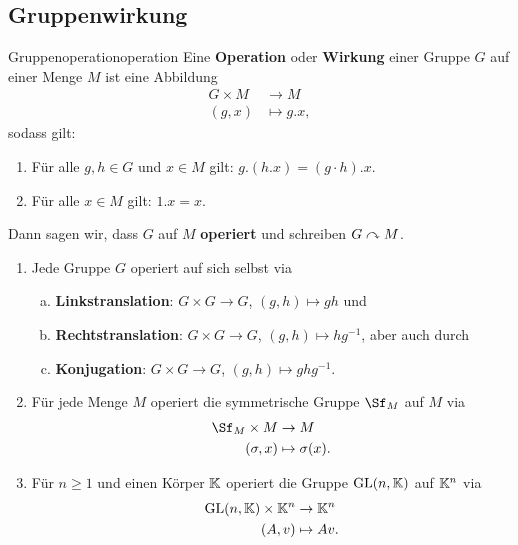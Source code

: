 \subsection{Gruppenwirkung}
\label{subsec:wirkung}
\begin{definition}{Gruppenoperation}{operation}
Eine \textbf{Operation} oder \textbf{Wirkung} einer Gruppe $G$ auf einer Menge $M$ ist eine Abbildung
\begin{align}
G \times M &\to M \\
(g, x) &\mapsto g . x,
\end{align}
sodass gilt:
\begin{enumerate}[({O}1)]
\item Für alle $g,h \in G$ und $x \in M$ gilt: $g.(h.x) = (g \cdot h).x$.
\item Für alle $x \in M$ gilt: $1.x=x$.
\end{enumerate}
Dann sagen wir, dass $G$ auf $M$ \textbf{operiert} und schreiben $G \curvearrowright M$.
\end{definition}
\begin{beispiele}
\begin{enumerate}
\item Jede Gruppe $G$ operiert auf sich selbst via
\begin{enumerate}[(a)]
\item \textbf{Linkstranslation}: $G \times G \to G$, $(g,h) \mapsto gh$ und
\item \textbf{Rechtstranslation}: $G \times G \to G$, $(g,h) \mapsto hg^{-1}$, aber auch durch
\item \textbf{Konjugation}: $G \times G \to G$, $(g,h) \mapsto ghg^{-1}$.
\end{enumerate}
\item Für jede Menge $M$ operiert die symmetrische Gruppe $\Sf_M$ auf $M$ via
\begin{equation}
\begin{split}
\Sf_M \times M &\to M \\
(\sigma, x) &\mapsto \sigma(x).
\end{split}
\end{equation}
\item Für $n\geq 1$ und einen Körper $\mathbb{K}$ operiert die Gruppe $\text{GL}(n,\mathbb{K})$ auf $\mathbb{K}^n$ via 
\begin{equation}
\begin{split}
\text{GL}(n,\mathbb{K}) \times \mathbb{K}^n &\to \mathbb{K}^n\\
(A,v) &\mapsto Av.
\end{split}
\end{equation}
\end{enumerate}
\end{beispiele}
